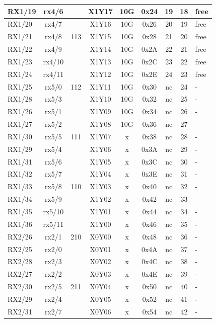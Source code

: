 \begin{longtable}{|l|c|c|c|c|c|c|c|l|}
RX1/19 & rx4/6  &     & X1Y17 & 10G & 0x24 & 19 & 18 & free\\\hline
RX1/20 & rx4/7  &     & X1Y16 & 10G & 0x26 & 20 & 19 & free\\\hline
RX1/21 & rx4/8  & 113 & X1Y15 & 10G & 0x28 & 21 & 20 & free\\\hline
RX1/22 & rx4/9  &     & X1Y14 & 10G & 0x2A & 22 & 21 & free\\\hline
RX1/23 & rx4/10 &     & X1Y13 & 10G & 0x2C & 23 & 22 & free\\\hline
RX1/24 & rx4/11 &     & X1Y12 & 10G & 0x2E & 24 & 23 & free\\\hline
RX1/25 & rx5/0  & 112 & X1Y11 & 10G & 0x30 & nc & 24 & -\\\hline
RX1/28 & rx5/3  &     & X1Y10 & 10G & 0x32 & nc & 25 & -\\\hline
RX1/26 & rx5/1  &     & X1Y09 & 10G & 0x34 & nc & 26 & -\\\hline
RX1/27 & rx5/2  &     & X1Y08 & 10G & 0x36 & nc & 27 & -\\\hline
RX1/30 & rx5/5  & 111 & X1Y07 &  x  & 0x38 & nc & 28 & -\\\hline
RX1/29 & rx5/4  &     & X1Y06 &  x  & 0x3A & nc & 29 & -\\\hline
RX1/31 & rx5/6  &     & X1Y05 &  x  & 0x3C & nc & 30 & -\\\hline
RX1/32 & rx5/7  &     & X1Y04 &  x  & 0x3E & nc & 31 & -\\\hline
RX1/33 & rx5/8  & 110 & X1Y03 &  x  & 0x40 & nc & 32 & -\\\hline
RX1/34 & rx5/9  &     & X1Y02 &  x  & 0x42 & nc & 33 & -\\\hline
RX1/35 & rx5/10 &     & X1Y01 &  x  & 0x44 & nc & 34 & -\\\hline
RX1/36 & rx5/11 &     & X1Y00 &  x  & 0x46 & nc & 35 & -\\\hline
RX2/26 & rx2/1  & 210 & X0Y00 &  x  & 0x48 & nc & 36 & -\\\hline        
RX2/25 & rx2/0  &     & X0Y01 &  x  & 0x4A & nc & 37 & -\\\hline        
RX2/28 & rx2/3  &     & X0Y02 &  x  & 0x4C & nc & 38 & -\\\hline        
RX2/27 & rx2/2  &     & X0Y03 &  x  & 0x4E & nc & 39 & -\\\hline   
RX2/30 & rx2/5  & 211 & X0Y04 &  x  & 0x50 & nc & 40 & -\\\hline   
RX2/29 & rx2/4  &     & X0Y05 &  x  & 0x52 & nc & 41 & -\\\hline   
RX2/31 & rx2/7  &     & X0Y06 &  x  & 0x54 & nc & 42 & -\\\hline   

\end{longtable}
